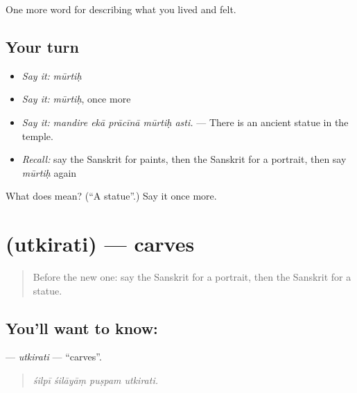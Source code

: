 \begin{grammarlens}[title={What you've built}]
One more word for describing what you lived and felt.
\end{grammarlens}

\subsection*{Your turn}
\begin{itemize}
\raggedright
  \item \emph{Say it:} \emph{mūrtiḥ}
  \item \emph{Say it:} \emph{mūrtiḥ}, once more
  \item \emph{Say it:} \emph{mandire ekā prācīnā mūrtiḥ asti.} — There is an ancient statue in the temple.
  \item \emph{Recall:} say the Sanskrit for paints, then the Sanskrit for a portrait, then say \emph{mūrtiḥ} again
\end{itemize}

\begin{tcolorbox}[breakable,colback=teal!4,colframe=teal!35!black,title={Before you move on}]
What does  mean? (\textquotedblleft{}A statue\textquotedblright{}.) Say it once more.
\end{tcolorbox}
\section[\texorpdfstring{\sk{उत्किरति} (utkirati)}{उत्किरति (utkirati)}]{ (utkirati) — carves}

\label{lesson:SA-C519-utkirati}



\begin{quote}
Before the new one: say the Sanskrit for a portrait, then the Sanskrit for a statue.
\end{quote}

\subsection*{You'll want to know: }
\textbf{} — \emph{utkirati} — \textquotedblleft{}carves\textquotedblright{}.

\begin{quote}
   
\end{quote}

\begin{quote}
\emph{śilpī śilāyāṃ puṣpam utkirati.}
\end{quote}

